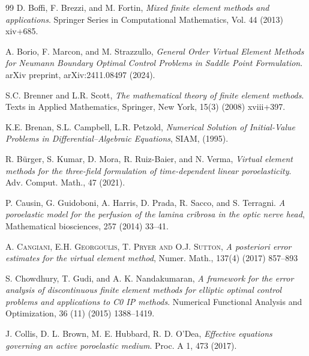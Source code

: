 \documentclass[smallextended]{svjour3}
\numberwithin{equation}{section}
\numberwithin{figure}{section}
\numberwithin{table}{section}
\begin{document}
\begin{thebibliography}{99}
		 {\sc D. Boffi, F. Brezzi,  and M. Fortin}, {\it Mixed finite element methods and applications}. Springer Series in Computational Mathematics, Vol. 44 (2013) xiv+685.
				
		 {\sc A. Borio, F. Marcon, and M. Strazzullo}, {\it General Order Virtual Element Methods for Neumann Boundary Optimal Control Problems in Saddle Point Formulation}. arXiv preprint,  arXiv:2411.08497 (2024).
				
		 {\sc S.C. Brenner and L.R. Scott}, {\it The mathematical theory of finite element methods}. Texts in Applied Mathematics, Springer, New York, 15(3) (2008) xviii+397.
				
		 {\sc K.E. Brenan, S.L. Campbell, L.R. Petzold}, {\it Numerical Solution of Initial-Value Problems in Differential–Algebraic Equations}, SIAM, (1995).
				
				
		 {\sc R. B\"urger, S. Kumar, D. Mora, R. Ruiz-Baier, and N. Verma}, {\it Virtual element methods for the three-field formulation of time-dependent linear poroelasticity}. Adv. Comput. Math.,  {47}  (2021).

         {\sc P. Causin, G. Guidoboni, A. Harris, D. Prada, R. Sacco, and S. Terragni}. {\it A poroelastic model for the perfusion of the lamina cribrosa in the optic nerve head}, Mathematical biosciences, 257 (2014) 33--41.
				
		 \textsc{A. Cangiani, E.H. Georgoulis, T. Pryer and O.J. Sutton}, \textit{A posteriori error estimates for the virtual element method}, Numer. Math., {137}(4) (2017)  857--893	
				
		 {\sc S.  Chowdhury, T. Gudi, and A. K. Nandakumaran}, {\it A framework for the error analysis of discontinuous finite element methods for elliptic optimal control problems and applications to C0 IP methods}. Numerical Functional Analysis and Optimization, 36 (11) (2015) 1388--1419.
		

         {\sc J. Collis, D. L. Brown, M. E. Hubbard, R. D. O’Dea}, {\it Effective equations governing an active poroelastic medium}. Proc. A 1, 473 (2017).
        

\end{thebibliography}
\end{document}
